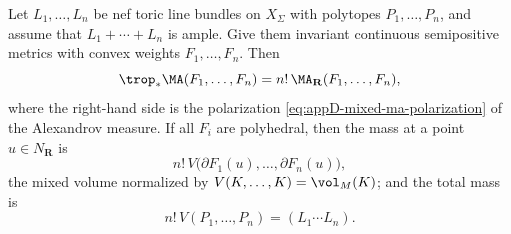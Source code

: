\begin{proposition}
\label{prop:ch31-toric-mixed}
Let \(L_1,\ldots,L_n\) be nef toric line bundles on \(X_\Sigma\) with
polytopes \(P_1,\ldots,P_n\), and assume that
\(L_1+\cdots+L_n\) is ample.  Give them invariant continuous semipositive
metrics with convex weights \(F_1,\ldots,F_n\).  Then
\begin{equation}
\label{eq:ch31-toric-mixed-measure}
 \trop_*\MA(F_1,\ldots,F_n)=n!\,\MA_{\mathbf R}(F_1,\ldots,F_n),
\end{equation}
where the right-hand side is the polarization
\eqref{eq:appD-mixed-ma-polarization} of the Alexandrov measure.  If all
\(F_i\) are polyhedral, then the mass at a point
\(u\in N_{\mathbf R}\) is
\begin{equation}
\label{eq:ch31-toric-mixed-atom}
 n!\,V\bigl(\partial F_1(u),\ldots,\partial F_n(u)\bigr),
\end{equation}
the mixed volume normalized by \(V(K,\ldots,K)=\vol_M(K)\); and the total
mass is
\begin{equation}
\label{eq:ch31-toric-mixed-mass}
 n!\,V(P_1,\ldots,P_n)=(L_1\cdots L_n).
\end{equation}
\end{proposition}

